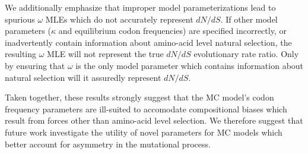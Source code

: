 \documentclass{pnastwo}
\begin{document}
\begin{article}
We additionally emphasize that improper model parameterizations lead to spurious $\omega$ MLEs which do not accurately represent $dN/dS$. If other model parameters ($\kappa$ and equilibrium codon frequencies) are specified incorrectly, or inadvertently contain information about amino-acid level natural selection, the resulting $\omega$ MLE will not represent the true $dN/dS$ evolutionary rate ratio. Only by ensuring that $\omega$ is the only model parameter which contains information about natural selection will it assuredly represent $dN/dS$. 
		
		Taken together, these results strongly suggest that the MC model's codon frequency parameters are ill-suited to accomodate compositional biases which result from forces other than amino-acid level selection. We therefore suggest that future work investigate the utility of novel parameters for MC models which better account for asymmetry in the mutational process.
		

		
		


\end{article}
\end{document}
